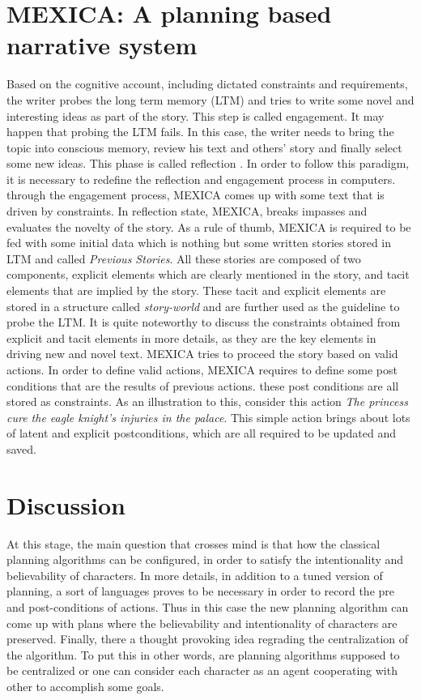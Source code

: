 \documentclass[english]{tktltiki}
\begin{document}
\section{MEXICA: A planning based narrative system}
Based on the cognitive account, including dictated constraints and requirements, the writer probes the long term memory (LTM) and tries to write some novel and interesting ideas as part of the story. This step is called engagement. It may happen that probing the LTM fails. In this case, the writer needs to bring the topic into conscious memory, review his text and others' story and finally select some new ideas. This phase is called reflection \cite{mexica}.
In order to follow this paradigm, it is necessary to redefine the reflection and engagement process in computers. through the engagement process, MEXICA comes up with some text that is driven by constraints. In reflection state, MEXICA, breaks impasses and evaluates the novelty of the story. As a rule of thumb, MEXICA is required to be fed with some initial data which is nothing but some written stories stored in LTM and called \textit{Previous Stories}. All these stories are composed of two components, explicit elements which are clearly mentioned in the story, and tacit elements that are implied by the story. These tacit and explicit elements are stored in a structure called \textit{story-world} and are further used as the guideline to probe the LTM.
It is quite noteworthy to discuss the constraints obtained from explicit and tacit elements in more details, as they are the key elements in driving new and novel text. MEXICA tries to proceed the story based on valid actions. In order to define valid actions, MEXICA requires to define some post conditions that are the results of previous actions. these post conditions are all stored as constraints. As an illustration to this, consider this action \textit{The princess cure the eagle knight's injuries in the palace}. This simple action brings about lots of latent and explicit postconditions, which are all required to be updated and saved.

\section{Discussion}
At this stage, the main question that crosses mind is that how the classical planning algorithms can be configured, in order to satisfy the intentionality and believability of characters. In more details, in addition to a tuned version of planning, a sort of languages proves to be necessary in order to record the pre and post-conditions of actions. Thus in this case the new planning algorithm can come up with plans where the believability and intentionality of characters are preserved. Finally, there a thought provoking idea regrading the centralization of the algorithm. To put this in other words, are planning algorithms supposed to be centralized or one can consider each character as an agent cooperating with other to accomplish some goals.\cite{surprise} \cite{narrativeconflict}
\end{document}
